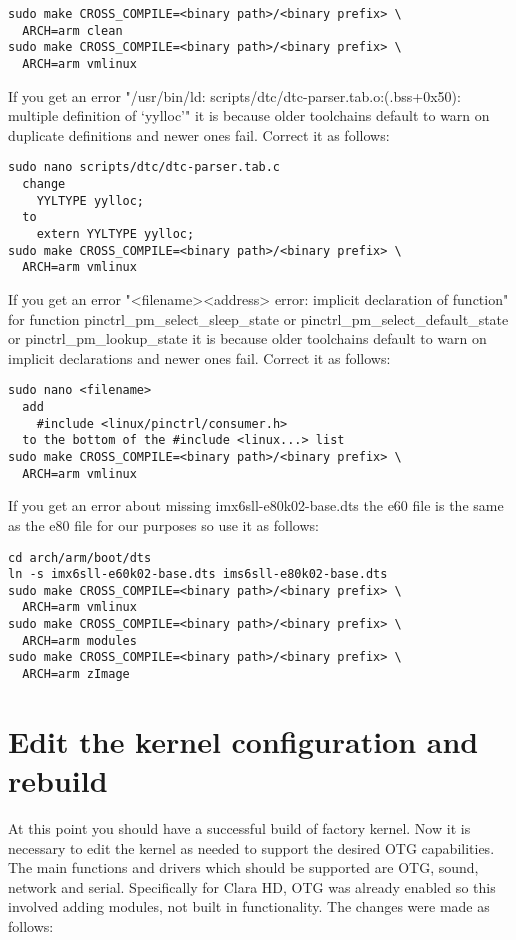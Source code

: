 \begin{verbatim}
sudo make CROSS_COMPILE=<binary path>/<binary prefix> \
  ARCH=arm clean
sudo make CROSS_COMPILE=<binary path>/<binary prefix> \
  ARCH=arm vmlinux
\end{verbatim}

If you get an error "/usr/bin/ld: scripts/dtc/dtc-parser.tab.o:(.bss+0x50):
multiple definition of `yylloc'" it is because older toolchains default
to warn on duplicate definitions and newer ones fail.  Correct it as follows:

\begin{verbatim}
sudo nano scripts/dtc/dtc-parser.tab.c
  change
    YYLTYPE yylloc;
  to
    extern YYLTYPE yylloc;
sudo make CROSS_COMPILE=<binary path>/<binary prefix> \
  ARCH=arm vmlinux
\end{verbatim}

If you get an error "<filename><address> error: implicit declaration of function"
for function pinctrl\_pm\_select\_sleep\_state or
pinctrl\_pm\_select\_default\_state or pinctrl\_pm\_lookup\_state it is because
older toolchains default to warn on implicit declarations and newer ones fail. 
Correct it as follows:

\begin{verbatim}
sudo nano <filename>
  add
    #include <linux/pinctrl/consumer.h>
  to the bottom of the #include <linux...> list
sudo make CROSS_COMPILE=<binary path>/<binary prefix> \
  ARCH=arm vmlinux
\end{verbatim}

If you get an error about missing imx6sll-e80k02-base.dts the e60 file is the
same as the e80 file for our purposes so use it as follows:

\begin{verbatim}
cd arch/arm/boot/dts
ln -s imx6sll-e60k02-base.dts ims6sll-e80k02-base.dts
sudo make CROSS_COMPILE=<binary path>/<binary prefix> \
  ARCH=arm vmlinux
sudo make CROSS_COMPILE=<binary path>/<binary prefix> \
  ARCH=arm modules
sudo make CROSS_COMPILE=<binary path>/<binary prefix> \
  ARCH=arm zImage
\end{verbatim}

\section{Edit the kernel configuration and rebuild}
At this point you should have a successful build of factory kernel.  Now it is necessary
to edit the kernel as needed to support the desired OTG capabilities.  The main
functions and drivers which should be supported are OTG, sound, network and  serial.
Specifically for Clara HD, OTG was already enabled so this involved adding modules, not
built in functionality.  The changes were made as follows:

